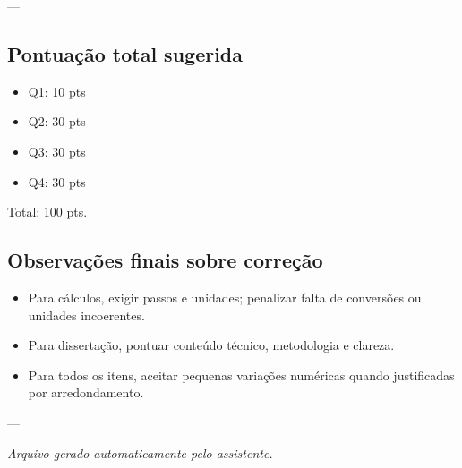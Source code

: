 \documentclass[11pt,a4paper]{article}
\begin{document}
---

\subsection{Pontuação total sugerida}
\begin{itemize}
\item Q1: 10 pts
\item Q2: 30 pts
\item Q3: 30 pts
\item Q4: 30 pts
\end{itemize}

Total: 100 pts.

\subsection{Observações finais sobre correção}
\begin{itemize}
\item Para cálculos, exigir passos e unidades; penalizar falta de conversões ou unidades incoerentes.
\item Para dissertação, pontuar conteúdo técnico, metodologia e clareza.
\item Para todos os itens, aceitar pequenas variações numéricas quando justificadas por arredondamento.
\end{itemize}

---

\emph{Arquivo gerado automaticamente pelo assistente.}
\end{document}
